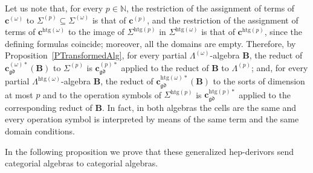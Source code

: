 \documentclass[a4paper, reqno]{amsbook}
\newcommand{\gd}{\mathfrak{gd}}              %
\newcommand{\htg}{\mathrm{htg}}                %
\theoremstyle{plain}
\theoremstyle{definition}
\begin{document}
Let us note that, for every $p\in\mathbb{N}$, the restriction of the assignment of terms of $\mathbf{c}^{(\omega)}$ to $\Sigma^{(p)}\subseteq\Sigma^{(\omega)}$ is that of $\mathbf{c}^{(p)}$, and the restriction of the assignment of terms of $\mathbf{c}^{\htg(\omega)}$ to the image of $\Sigma^{\htg(p)}$ in $\Sigma^{\htg(\omega)}$ is that of $\mathbf{c}^{\htg(p)}$, since the defining formulas coincide; moreover, all the domains are empty.
Therefore, by Proposition~\ref{PTransformedAlg}, for every partial $\Lambda^{(\omega)}$-algebra $\mathbf{B}$, the reduct of $\mathbf{c}^{(\omega)\ast}_{\gd}(\mathbf{B})$ to $\Sigma^{(p)}$ is $\mathbf{c}^{(p)\ast}_{\gd}$ applied to the reduct of $\mathbf{B}$ to $\Lambda^{(p)}$; and, for every partial $\Lambda^{\htg(\omega)}$-algebra $\mathbf{B}$, the reduct of $\mathbf{c}^{\htg(\omega)\ast}_{\gd}(\mathbf{B})$ to the sorts of dimension at most $p$ and to the operation symbols of $\Sigma^{\htg(p)}$ is $\mathbf{c}^{\htg(p)\ast}_{\gd}$ applied to the corresponding reduct of $\mathbf{B}$.
In fact, in both algebras the cells are the same and every operation symbol is interpreted by means of the same term and the same domain conditions.

In the following proposition we prove that these generalized hep-derivors send categorial algebras to categorial algebras.
\end{document}
